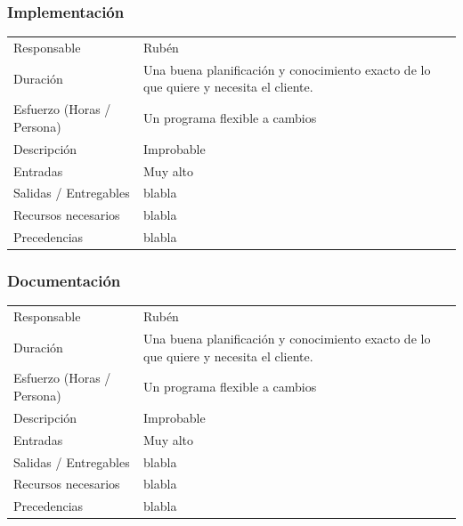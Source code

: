 \subsubsection{Implementaci\'{o}n}
\begin{table}[H]
    \begin{center}
        \begin{tabular}{l p{8cm}}
            Responsable                           & Rub\'{e}n \\
            Duraci\'{o}n                          & Una buena planificación y conocimiento exacto de lo que quiere y necesita el cliente. \\ 
            Esfuerzo (Horas / Persona)            & Un programa flexible a cambios \\
            Descripci\'{o}n                       & Improbable \\
            Entradas                              & Muy alto\\
            Salidas / Entregables                 & blabla \\
            Recursos necesarios                   & blabla \\
            Precedencias                          & blabla \\
        \end{tabular}
    \end{center}
    
\end{table}

\subsubsection{Documentaci\'{o}n}
\begin{table}[H]
    \begin{center}
        \begin{tabular}{l p{8cm}}
            Responsable                           & Rub\'{e}n \\
            Duraci\'{o}n                          & Una buena planificación y conocimiento exacto de lo que quiere y necesita el cliente. \\ 
            Esfuerzo (Horas / Persona)            & Un programa flexible a cambios \\
            Descripci\'{o}n                       & Improbable \\
            Entradas                              & Muy alto\\
            Salidas / Entregables                 & blabla \\
            Recursos necesarios                   & blabla \\
            Precedencias                          & blabla \\
        \end{tabular}
    \end{center}
    
\end{table}

